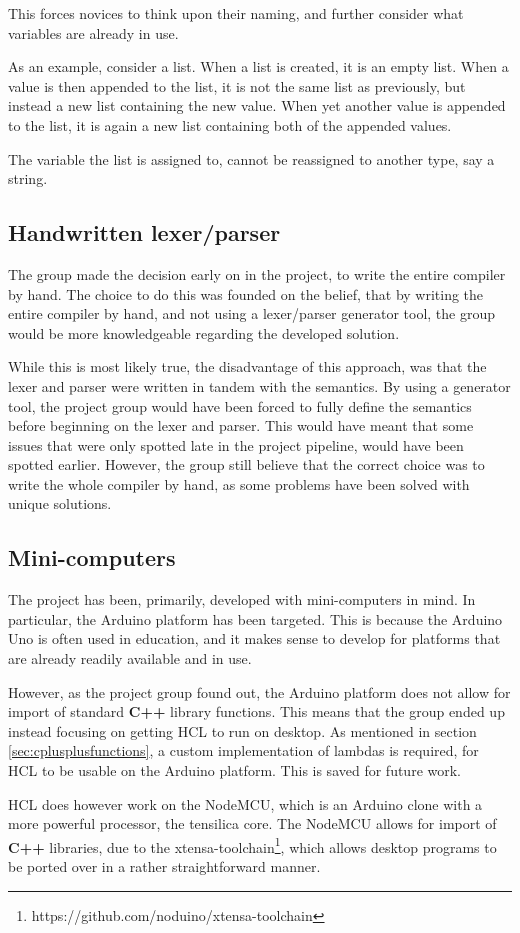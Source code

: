 This forces novices to think upon their naming, and further consider what variables are already in use.

As an example, consider a list.
When a list is created, it is an empty list.
When a value is then appended to the list, it is not the same list as previously, but instead a new list containing the new value.
When yet another value is appended to the list, it is again a new list containing both of the appended values.

The variable the list is assigned to, cannot be reassigned to another type, say a string.

\subsection{Handwritten lexer/parser}
The group made the decision early on in the project, to write the entire compiler by hand.
The choice to do this was founded on the belief, that by writing the entire compiler by hand, and not using a lexer/parser generator tool, the group would be more knowledgeable regarding the developed solution.

While this is most likely true, the disadvantage of this approach, was that the lexer and parser were written in tandem with the semantics.
By using a generator tool, the project group would have been forced to fully define the semantics before beginning on the lexer and parser.
This would have meant that some issues that were only spotted late in the project pipeline, would have been spotted earlier.
However, the group still believe that the correct choice was to write the whole compiler by hand, as some problems have been solved with unique solutions.

\subsection{Mini-computers}
The project has been, primarily, developed with mini-computers in mind.
In particular, the Arduino platform has been targeted.
This is because the Arduino Uno is often used in education, and it makes sense to develop for platforms that are already readily available and in use.

However, as the project group found out, the Arduino platform does not allow for import of standard \textbf{C++} library functions.
This means that the group ended up instead focusing on getting HCL to run on desktop.
As mentioned in section \ref{sec:cplusplusfunctions}, a custom implementation of lambdas is required, for HCL to be usable on the Arduino platform.
This is saved for future work.

HCL does however work on the NodeMCU, which is an Arduino clone with a more powerful processor, the tensilica core.
The NodeMCU allows for import of \textbf{C++} libraries, due to the xtensa-toolchain\footnote{https://github.com/noduino/xtensa-toolchain}, which allows desktop programs to be ported over in a rather straightforward manner.


